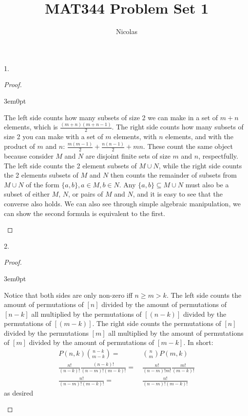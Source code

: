 \documentclass[11pt]{article}
\title{MAT344 Problem Set 1}
\author{Nicolas}
\newenvironment{myproof}
{\begin{proof} \begin{adjustwidth}{3em}{0pt}$ $\par\nobreak\ignorespaces}
{\end{adjustwidth} \end{proof}}
\begin{document}
\maketitle
\begin{flushleft}

1.

\begin{myproof}

The left side counts how many subsets of size 2 we can make in a set of $m+n$ elements, which is $\frac{(m+n)(m+n-1)}{2}$. The right side counts how many subsets of size 2 you can make with a set of $m$ elements, with $n$ elements, and with the product of $m$ and $n$: $\frac{m(m-1)}{2} + \frac{n(n-1)}{2} + mn$. These count the same object because consider $M$ and $N$ are disjoint finite sets of size $m$ and $n$, respectfully. The left side counts the 2 element subsets of $M \cup N$, while the right side counts the 2 elements subsets of $M$ and $N$ then counts the remainder of subsets from $M \cup N$ of the form $\{a,b\}, a \in M, b  \in N$. Any $\{a,b\} \subseteq M \cup N$ must also be a subset of either $M$, $N$, or pairs of $M$ and $N$, and it is easy to see that the converse also holds. We can also see through simple algebraic manipulation, we can show the second formula is equivalent to the first.

\end{myproof}

\newpage

2.

\begin{myproof}

Notice that both sides are only non-zero iff $n\geq m > k$. The left side counts the amount of permutations of $[n]$ divided by the amount of permutations of $[n-k]$ all multiplied by the permutations of $[(n-k)]$ divided by the permutations of $[(m-k)]$. The right side counts the permutations of $[n]$ divided by the permutations $[m]$ all multiplied by the amount of permutations of $[m]$ divided by the amount of permutations of $[m-k]$. In short:
\begin{align*}
P(n,k) {n-k \choose m-k} = & \ {n \choose m} P(m,k) \\
\frac{n!}{(n-k)!}\frac{(n-k)!}{(n-m)!(m-k)!} = & \ \frac{n!}{(n-m)!m!} \frac{m!}{(m-k)!} \\
\frac{n!}{(n-m)!(m-k)!} = & \ \frac{n!}{(n-m)!(m-k)!}
\end{align*}
as desired

\end{myproof}


\end{flushleft}
\end{document}
